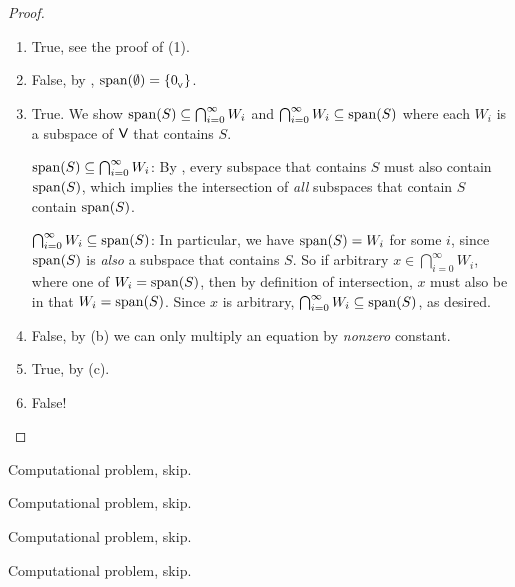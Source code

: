 \begin{proof}\ 

\begin{enumerate}
\item True, see the proof of (1).
\item False, by , \(\operatorname{span}(\emptyset) = \{ 0_{_{\textsf{V}}} \}\).
\item True.
      We show \(\operatorname{span}(S) \subseteq \bigcap_{i = 0}^{\infty} W_i\) and \(\bigcap_{i = 0}^{\infty} W_i \subseteq \operatorname{span}(S)\) where each \(W_i\) is a subspace of \(\textsf{V}\) that contains \(S\).
      
      \(\operatorname{span}(S) \subseteq \bigcap_{i = 0}^{\infty} W_i\): By , every subspace that contains \(S\) must also contain \(\operatorname{span}(S)\), which implies the intersection of \emph{all} subspaces that contain \(S\) contain \(\operatorname{span}(S)\).
      
      \(\bigcap_{i = 0}^{\infty} W_i \subseteq \operatorname{span}(S)\):
      In particular, we have \(\operatorname{span}(S) = W_i\) for some \(i\), since \(\operatorname{span}(S)\) is \emph{also} a subspace that contains \(S\).
      So if arbitrary \(x \in \bigcap_{i = 0}^{\infty} W_i\), where one of \(W_i = \operatorname{span}(S)\), then by definition of intersection, \(x\) must also be in that \(W_i = \operatorname{span}(S)\).
      Since \(x\) is arbitrary, \(\bigcap_{i = 0}^{\infty} W_i \subseteq \operatorname{span}(S)\), as desired.
\item False, by (b) we can only multiply an equation by \emph{nonzero} constant.
\item True, by (c).
\item False!
\end{enumerate}
\end{proof}

\begin{exercise} \label{exercise 1.4.2}
Computational problem, skip.
\end{exercise}

\begin{exercise} \label{exercise 1.4.3}
Computational problem, skip.
\end{exercise}

\begin{exercise} \label{exercise 1.4.4}
Computational problem, skip.
\end{exercise}

\begin{exercise} \label{exercise 1.4.5}
Computational problem, skip.
\end{exercise}

